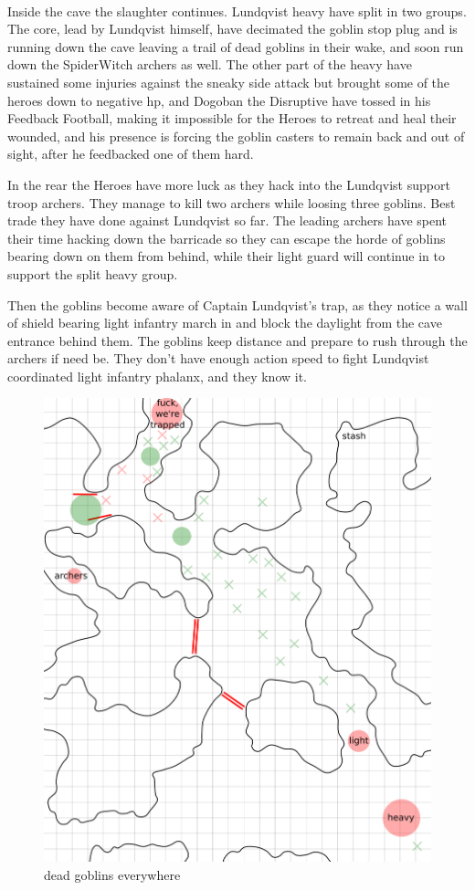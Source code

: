 \

Inside the cave the slaughter continues. Lundqvist heavy have split in two groups. The core, lead by Lundqvist himself, have decimated the goblin stop plug and is running down the cave leaving a trail of dead goblins in their wake, and soon run down the SpiderWitch archers as well. The other part of the heavy have sustained some injuries against the sneaky side attack but brought some of the heroes down to negative hp, and Dogoban the Disruptive have tossed in his Feedback Football, making it impossible for the Heroes to retreat and heal their wounded, and his presence is forcing the goblin casters to remain back and out of sight, after he feedbacked one of them hard.

In the rear the Heroes have more luck as they hack into the Lundqvist support troop archers. They manage to kill two archers while loosing three goblins. Best trade they have done against Lundqvist so far. The leading archers have spent their time hacking down the barricade so they can escape the horde of goblins bearing down on them from behind, while their light guard will continue in to support the split heavy group.

Then the goblins become aware of Captain Lundqvist's trap, as they notice a wall of shield bearing light infantry march in and block the daylight from the cave entrance behind them. The goblins keep distance and prepare to rush through the archers if need be. They don't have enough action speed to fight Lundqvist coordinated light infantry phalanx, and they know it.


\begin{figure}    %
\centering
\includegraphics[width=0.9\linewidth]{./fig/hool2lundqvistresult3-zoom.png}
\caption*{dead goblins everywhere}
\end{figure}

